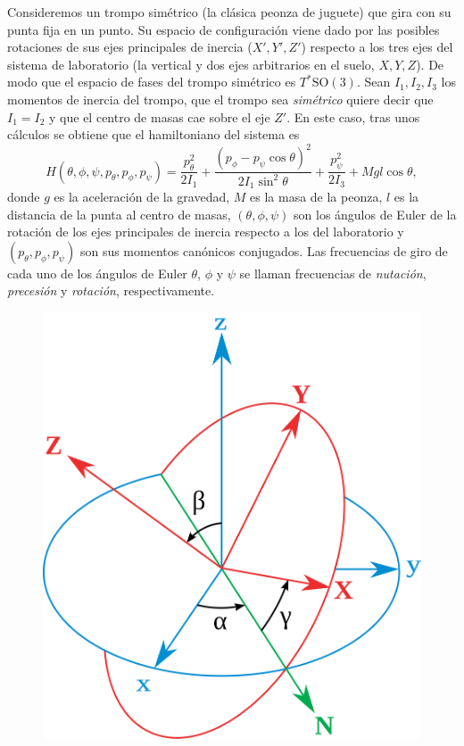 \begin{ejemplo}
  Consideremos un trompo simétrico (la clásica peonza de juguete) que gira con su punta fija en un punto. Su espacio de configuración viene dado por las posibles rotaciones de sus ejes principales de inercia ($X',Y',Z'$) respecto a los tres ejes del sistema de laboratorio (la vertical y dos ejes arbitrarios en el suelo, $X,Y,Z$). De modo que el espacio de fases del trompo simétrico es $T^*\mathrm{SO}(3)$. Sean $I_1,I_2,I_3$ los momentos de inercia del trompo, que el trompo sea \emph{simétrico} quiere decir que $I_1=I_2$ y que el centro de masas cae sobre el eje $Z'$. En este caso, tras unos cálculos se obtiene que el hamiltoniano del sistema es
  \begin{equation*}
    H(\theta,\phi,\psi,p_{\theta},p_{\phi},p_{\psi})=\frac{p_{\theta}^2}{2I_1}+\frac{(p_{\phi}-p_{\psi}\cos\theta)^2}{2I_1\sin^2\theta}+\frac{p_{\psi}^2}{2I_3}+Mgl\cos \theta,
  \end{equation*}
  donde $g$ es la aceleración de la gravedad, $M$ es la masa de la peonza, $l$ es la distancia de la punta al centro de masas, $(\theta,\phi,\psi)$ son los ángulos de Euler de la rotación de los ejes principales de inercia respecto a los del laboratorio y $(p_{\theta},p_{\phi},p_{\psi})$ son sus momentos canónicos conjugados. 
  Las frecuencias de giro de cada uno de los ángulos de Euler $\theta$, $\phi$ y $\psi$ se llaman frecuencias de \emph{nutación}, \emph{precesión} y \emph{rotación}, respectivamente.
  \begin{figure}[h]
    \label{fig:euler}
    \centering
    \begin{minipage}[b]{0.4\textwidth}
    \includegraphics[width=\textwidth]{pics/euler}

\end{minipage}
\end{figure}
\end{ejemplo}
